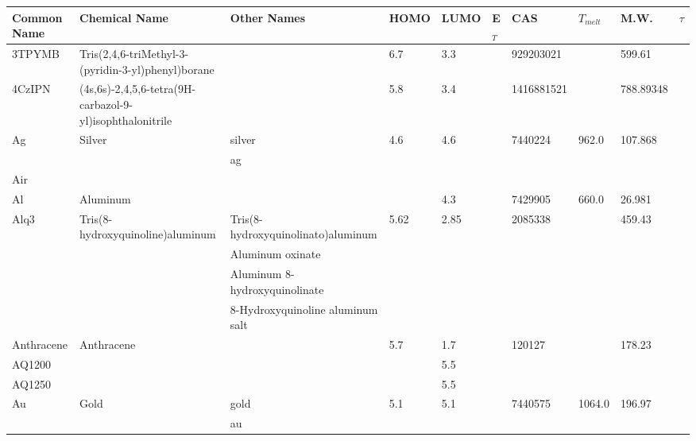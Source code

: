 \documentclass{article}
\begin{document}
\begin{landscape}
\begin{longtable}{| p{} | p{} | p{} | p{} | p{} | p{} | p{} | p{} | p{} | p{} | }

 \hline 
\textbf{Common Name} & \textbf{Chemical Name} & \textbf{Other Names} & \textbf{HOMO} & \textbf{LUMO} & E$_T$ & \textbf{CAS} & $T_{melt}$ & \textbf{M.W.} & $\tau$ \\
 \hline 
\endhead3TPYMB & Tris(2,4,6-triMethyl-3-(pyridin-3-yl)phenyl)borane &  & 6.7 & 3.3 &  & 929203021 &  & 599.61 &  \\ 
 
 \hline 
4CzIPN & (4s,6s)-2,4,5,6-tetra(9H-carbazol-9-yl)isophthalonitrile &  & 5.8 & 3.4 &  & 1416881521 &  & 788.89348 &  \\ 
 
 \hline 
Ag & Silver & silver & 4.6 & 4.6 &  & 7440224 & 962.0 & 107.868 &  \\ 
 & & ag &  &  &  &  & & & \\ 
 
 \hline 
Air &  &  &  &  &  &  &  &  &  \\ 
 
 \hline 
Al & Aluminum &  &  & 4.3 &  & 7429905 & 660.0 & 26.981 &  \\ 
 
 \hline 
Alq3 & Tris(8-hydroxyquinoline)aluminum & Tris(8-hydroxyquinolinato)aluminum & 5.62 & 2.85 &  & 2085338 &  & 459.43 &  \\ 
 & & Aluminum oxinate &  &  &  &  & & & \\ 
 & & Aluminum 8-hydroxyquinolinate &  &  &  &  & & & \\ 
 & & 8-Hydroxyquinoline aluminum salt &  &  &  &  & & & \\ 
 
 \hline 
Anthracene & Anthracene &  & 5.7 & 1.7 &  & 120127 &  & 178.23 &  \\ 
 
 \hline 
AQ1200 &  &  &  & 5.5 &  &  &  &  &  \\ 
 
 \hline 
AQ1250 &  &  &  & 5.5 &  &  &  &  &  \\ 
 
 \hline 
Au & Gold & gold & 5.1 & 5.1 &  & 7440575 & 1064.0 & 196.97 &  \\ 
 & & au &  &  &  &  & & & \\ 
 

\end{longtable}
\end{landscape}
\end{document}
